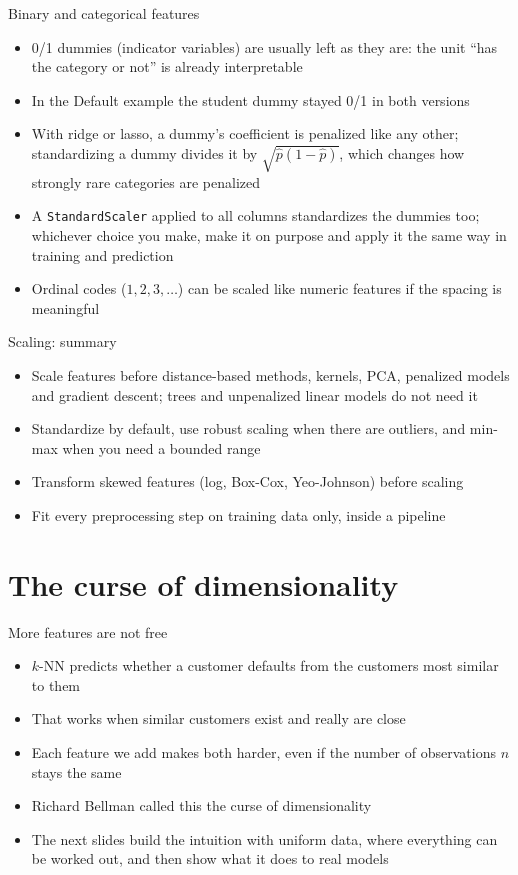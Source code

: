 \begin{frame}{Binary and categorical features}
    \begin{itemize}
        \item 0/1 dummies (indicator variables) are usually left as they are: the unit ``has the category or not'' is already interpretable
        \item In the Default example the student dummy stayed 0/1 in both versions
        \item With ridge or lasso, a dummy's coefficient is penalized like any other; standardizing a dummy divides it by $\sqrt{\hat{p}(1 - \hat{p})}$, which changes how strongly rare categories are penalized
        \item A \texttt{StandardScaler} applied to all columns standardizes the dummies too; whichever choice you make, make it on purpose and apply it the same way in training and prediction
        \item Ordinal codes ($1, 2, 3, \dots$) can be scaled like numeric features if the spacing is meaningful
    \end{itemize}
\end{frame}

\begin{frame}{Scaling: summary}
    \begin{itemize}
        \item Scale features before distance-based methods, kernels, PCA, penalized models and gradient descent; trees and unpenalized linear models do not need it
        \item Standardize by default, use robust scaling when there are outliers, and min-max when you need a bounded range
        \item Transform skewed features (log, Box-Cox, Yeo-Johnson) before scaling
        \item Fit every preprocessing step on training data only, inside a pipeline
    \end{itemize}
\end{frame}


\section{The curse of dimensionality}

\begin{frame}{More features are not free}
    \begin{itemize}
        \item $k$-NN predicts whether a customer defaults from the customers most similar to them
        \item That works when similar customers exist and really are close
        \item Each feature we add makes both harder, even if the number of observations $n$ stays the same
        \item Richard Bellman called this the curse of dimensionality
        \item The next slides build the intuition with uniform data, where everything can be worked out, and then show what it does to real models
    \end{itemize}
\end{frame}

